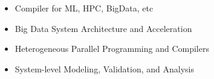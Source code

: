 

%
%

\vspace{1mm}
\begin{itemize}
\item Compiler for ML, HPC, BigData, etc
\item Big Data System Architecture and Acceleration
\item Heterogeneous Parallel Programming and Compilers
\item System-level Modeling, Validation, and Analysis
\end{itemize}


